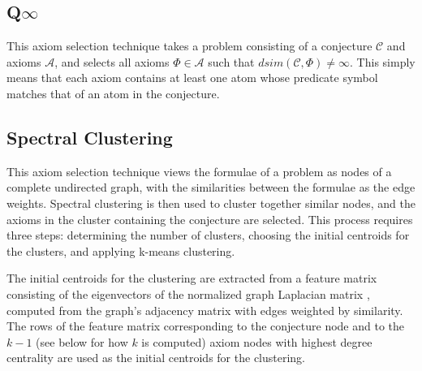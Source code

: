 \documentclass[]{ceurart}
\begin{document}
\subsection{Q$\infty$}
\label{QinghuaInf}

This axiom selection technique takes a problem consisting of a conjecture 
$\mathcal{C}$ and axioms $\mathcal{A}$, and selects all axioms 
$\Phi \in \mathcal{A}$ such that $dsim(\mathcal{C},\Phi) \neq \infty$.
This simply means that each axiom contains at least one atom whose predicate
symbol matches that of an atom in the conjecture.

% 
\subsection{Spectral Clustering}
\label{Zishi}

This axiom selection technique views the formulae of a problem as nodes
of a complete undirected graph, with the similarities between the formulae 
as the edge weights.
Spectral clustering \cite{vLu07} is then used to cluster together similar 
nodes, and the axioms in the cluster containing the conjecture are selected.
This process requires three steps:
determining the number of clusters,
choosing the initial centroids for the clusters,
and
applying k-means clustering.

The initial centroids for the clustering are extracted from a feature matrix 
consisting of the eigenvectors of the normalized graph Laplacian matrix 
\cite{vLu07}, computed from the graph's adjacency matrix with edges weighted
by similarity.
The rows of the feature matrix corresponding to the conjecture node and to 
the $k-1$ (see below for how $k$ is computed) axiom nodes with highest degree 
centrality are used as the initial centroids for the clustering.
\end{document}
